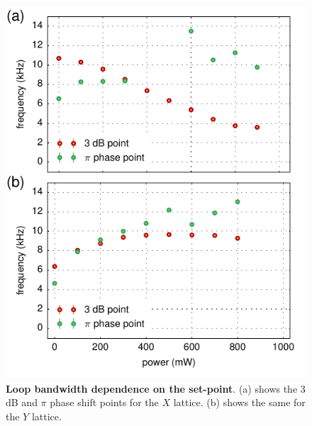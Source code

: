 \documentclass[twocolumn,aps,pra,showpacs,preprintnumbers,bibnotes]{revtex4-1}
\begin{document}
\begin{figure}
  \begin{center}
    \includegraphics{fig/low_power_bandwidths.pdf}
    \caption{\textbf{Loop bandwidth dependence on the set-point}. (a) shows the $3$ dB and $\pi$ phase shift points for the $X$ lattice. (b) shows the same for the $Y$ lattice.}\label{fig:bandwidth}
  \end{center}
\end{figure}
\end{document}
